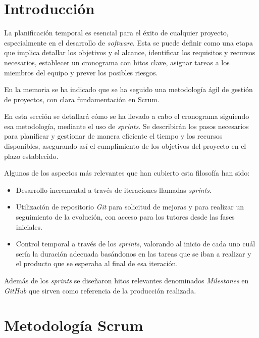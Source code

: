 
\section{Introducción}
La planificación temporal es esencial para el éxito de cualquier proyecto, especialmente
en el desarrollo de \textit{software}. Esta se puede definir como una etapa que implica
detallar los objetivos y el alcance, identificar los requisitos y recursos
necesarios, establecer un cronograma con hitos clave, asignar tareas a los
miembros del equipo y prever los posibles riesgos.

En la memoria se ha indicado que se ha seguido una metodología ágil de gestión
de proyectos, con clara fundamentación en Scrum\citep{wiki:scrum}.

En esta sección se detallará cómo se ha llevado a cabo el cronograma siguiendo esa
metodología, mediante el uso de \textit{sprints}. Se describirán los pasos
necesarios para planificar y gestionar de manera eficiente el tiempo y los
recursos disponibles, asegurando así el cumplimiento de los objetivos del proyecto
en el plazo establecido.

Algunos de los aspectos más relevantes que han cubierto esta filosofía han sido:

\begin{itemize}
	\tightlist

	\item Desarrollo incremental a través de iteraciones llamadas \emph{sprints}.

	\item Utilización de repositorio \emph{Git}\citep{online:git} para solicitud
		de mejoras y para realizar un seguimiento de la evolución, con acceso para los
		tutores desde las fases iniciales.

	\item Control temporal a través de los \emph{sprints}, valorando al inicio de cada
		uno cuál sería la duración adecuada basándonos en las tareas que se iban a realizar
		y el producto que se esperaba al final de esa iteración.

\end{itemize}

Además de los \emph{sprints} se diseñaron hitos relevantes denominados \emph{Milestones}
en \emph{GitHub} que sirven como referencia de la producción realizada.

\section{Metodología Scrum}

